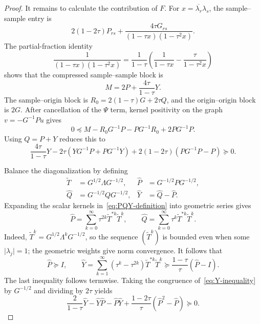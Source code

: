 \documentclass[preprints,article,submit,oneauthor]{Definitions/mdpi}
\theoremstyle{mdpi}
\theoremstyle{definition}
\begin{document}
\begin{proof}
It remains to calculate the contribution of $F$.  For
$x=\overline{\lambda_r}\lambda_s$, the sample--sample entry is
\begin{equation}
  2(1-2\tau)P_{rs}
  +\frac{4\tau G_{rs}}{(1-\tau x)(1-\tau^2x)}.
  \label{eq:sampled-main-block}
\end{equation}
The partial-fraction identity
\[
  \frac1{(1-\tau x)(1-\tau^2x)}
  =\frac1{1-\tau}\left(\frac1{1-\tau x}
  -\frac{\tau}{1-\tau^2x}\right)
\]
shows that the compressed sample--sample block is
\[
  M=2P+\frac{4\tau}{1-\tau}Y.
\]
The sample--origin block is $R_0=2(1-\tau)G+2\tau Q$, and the
origin--origin block is $2G$.  After cancellation of the $\Psi$ term,
kernel positivity on the graph $v=-G^{-1}Pu$ gives
\begin{equation}
  0\preceq M-R_0G^{-1}P-PG^{-1}R_0+2PG^{-1}P.
\label{eq:pre-gramian-inequality}
\end{equation}
Using $Q=P+Y$ reduces this to
\begin{equation}
  \frac{4\tau}{1-\tau}Y
  -2\tau(YG^{-1}P+PG^{-1}Y)
  +2(1-2\tau)(PG^{-1}P-P)\succeq0.
  \label{eq:Y-inequality}
\end{equation}

Balance the diagonalization by defining
\begin{equation}
\begin{aligned}
  \widetilde T&=G^{1/2}\Lambda G^{-1/2},
  &\widehat P&=G^{-1/2}PG^{-1/2},\\
  \widehat Q&=G^{-1/2}QG^{-1/2},
  &\widehat Y&=\widehat Q-\widehat P.
\end{aligned}
\label{eq:balanced-definitions}
\end{equation}
Expanding the scalar kernels in~\eqref{eq:PQY-definition} into
geometric series gives
\begin{equation}
  \widehat P=\sum_{k=0}^{\infty}
  \tau^{2k}\widetilde T^{*k}\widetilde T^k,
  \qquad
  \widehat Q=\sum_{k=0}^{\infty}
  \tau^k\widetilde T^{*k}\widetilde T^k.
  \label{eq:two-gramians}
\end{equation}
Indeed, $\widetilde T^k=G^{1/2}\Lambda^k G^{-1/2}$, so the sequence
$(\widetilde T^k)$ is bounded even when some
$\lvert\lambda_j\rvert=1$; the
geometric weights give norm convergence.  It follows that
\begin{equation}
  \widehat P\succeq I,
  \qquad
  \widehat Y=
  \sum_{k=1}^{\infty}(\tau^k-\tau^{2k})
  \widetilde T^{*k}\widetilde T^k
  \succeq\frac{1-\tau}{\tau}(\widehat P-I).
  \label{eq:Yhat-positive}
\end{equation}
The last inequality follows termwise.  Taking the congruence
of~\eqref{eq:Y-inequality} by $G^{-1/2}$ and dividing by $2\tau$ yields
\begin{equation}
  \frac{2}{1-\tau}\widehat Y
  -\widehat Y\widehat P-\widehat P\widehat Y
  +\frac{1-2\tau}{\tau}(\widehat P^2-\widehat P)\succeq0.
  \label{eq:Yhat-inequality}
\end{equation}


\end{proof}
\end{document}
